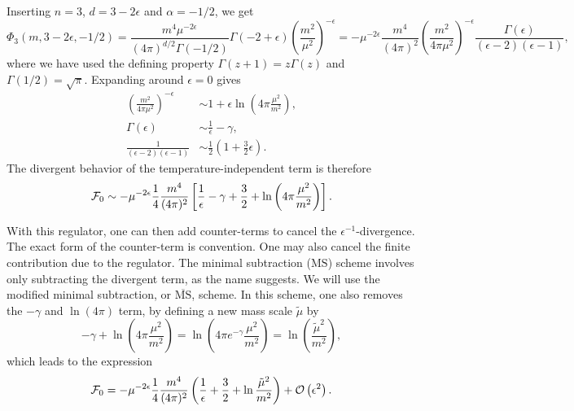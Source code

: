 Inserting $n=3$, $d = 3 - 2\epsilon$ and $\alpha = -1/2$, we get
\begin{equation}
    \Phi_3(m, 3 - 2\epsilon, -1/2)
    =
    \frac{m^4 \mu^{-2\epsilon}}{(4 \pi)^{d/2}\Gamma(-1/2)} \Gamma(-2 + \epsilon) \left(\frac{m^2}{\mu^2}\right)^{-\epsilon}
    =
    - \mu^{-2\epsilon} \frac{m^4}{(4 \pi)^{2}}
    \left(\frac{m^2}{4 \pi \mu^2}\right)^{- \epsilon}
    \frac{\Gamma(\epsilon)}{(\epsilon - 2)(\epsilon - 1)},
\end{equation}
where we have used the defining property $\Gamma(z + 1) = z\Gamma(z)$ and $\Gamma(1/2) = \sqrt \pi$.
Expanding around $\epsilon = 0$ gives
\begin{align}
    \left(\frac{m^2}{4 \pi \mu^2}\right)^{- \epsilon}
    &\sim 1 + \epsilon \ln\left(4 \pi \frac{\mu^2}{m^2}\right),\\
    \Gamma(\epsilon) 
    & \sim \frac{1}{\epsilon} - \gamma, \\
    \frac{1}{(\epsilon - 2)(\epsilon - 1)}
    &\sim \frac{1}{2}\left(1 + \frac{3}{2} \epsilon\right).
\end{align}
The divergent behavior of the temperature-independent term is therefore
\begin{align}
    \mathcal{F}_0 \sim
    - \mu^{-2\epsilon} \frac{1}{4}\frac{m^4}{(4 \pi)^2}
    \left[
        \frac{1}{\epsilon} 
        - \gamma + \frac{3}{2}
        + \ln\left(4 \pi \frac{\mu^2}{m^2}\right)
    \right].
\end{align}

With this regulator, one can then add counter-terms to cancel the $\epsilon^{-1}$-divergence.
The exact form of the counter-term is convention.
One may also cancel the finite contribution due to the regulator.
The minimal subtraction ($\mathrm{MS}$) scheme involves only subtracting the divergent term, as the name suggests.
We will use the modified minimal subtraction, or $\overline{ \mathrm{MS}}$, scheme.
In this scheme, one also removes the $-\gamma$ and $\ln(4 \pi)$ term, by defining a new mass scale $\tilde \mu$ by
\begin{equation}
    \label{definition mu tilde MS bar}
    -\gamma + \ln(4\pi \frac{\mu^2}{m^2}) = \ln(4\pi e^{-\gamma} \frac{\mu^2}{m^2}) = \ln(\frac{\tilde\mu^2}{m^2}),
\end{equation}
which leads to the expression
\begin{equation}
    \label{free field regularized energy}
    \mathcal{F}_0 =
    - \mu^{-2\epsilon} \frac{1}{4}\frac{m^4}{(4 \pi)^2}
    \left(
        \frac{1}{\epsilon} 
        + \frac{3}{2}
        + \ln \frac{\tilde\mu^2}{m^2}
    \right)
    + \mathcal{O}\left(\epsilon^{2}\right).
\end{equation}

